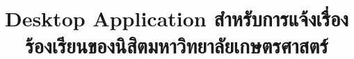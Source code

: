 \documentclass{article}
\title{\Huge\flushleft \textbf{\thetitle}\\
\vspace{1ex}
\LARGE\ourTeam\\
\vspace{5ex}
\large Desktop Application สำหรับการแจ้งเรื่องร้องเรียนของนิสิตมหาวิทยาลัยเกษตรศาสตร์}
\author{}
\date{}
\begin{document}
\begin{titlepage}
\maketitle
\thispagestyle{empty}
\vspace{-2ex}
\tableofcontents
\end{titlepage}

\newpage








\end{document}
